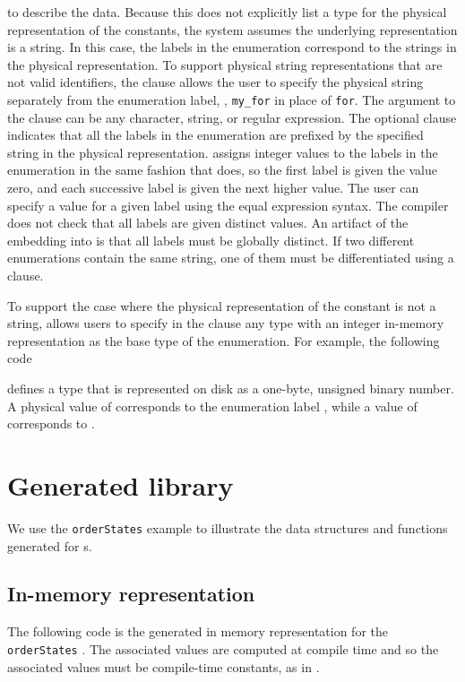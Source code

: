 %
\noindent
to describe the data. Because this \penum{} does not explicitly list a
\pads{} type for the physical representation of the constants, the
system assumes the underlying representation is a string.  In this case,
the labels in the enumeration correspond to the strings in the
physical representation.  To support physical string representations that are
not valid \C{} identifiers, the \Pfrom{} clause allows the user to
specify the physical string separately from the enumeration label,
\eg{}, \texttt{my\_for} in place of \texttt{for}.  The argument 
to the \Pfrom{} clause can be any character, string, or regular expression.
The optional \Pprefix{} clause indicates that all the
labels in the enumeration are prefixed by the specified string in the
physical representation.  \pads{} assigns integer values to the labels
in the enumeration in the same fashion that \C{} does, so the first
label is given the value zero, and each successive label is given the
next higher value.  The user can specify a value for a given label
using the equal expression syntax.  The compiler does not check that
all labels are given distinct values. An artifact of the embedding
into \C{} is that all labels must be globally distinct.  If two
different enumerations contain the same string, one of them must be
differentiated using a \Pfrom{} clause.

To support the case where the physical representation of the constant
is not a string, \pads{} allows users to specify in the 
 clause any \pads{} type with an integer
in-memory representation as the base type of the enumeration.  For
example, the following code

%
\noindent
defines a type  that is represented on disk as a one-byte,
unsigned binary number.  A physical value of  corresponds to the
enumeration label , while a value of  corresponds to
. 

\section{Generated library}
We use the \texttt{orderStates} example to illustrate the data
structures and functions generated for \Penum{}s.
\subsection{In-memory representation}
\label{sec:enums-rep}
The following \C{} code is the generated in memory representation for
the \texttt{orderStates} \Penum{}. The associated values are computed
at \pads{} compile time and so the associated values must be
compile-time constants, as in \C{}.


